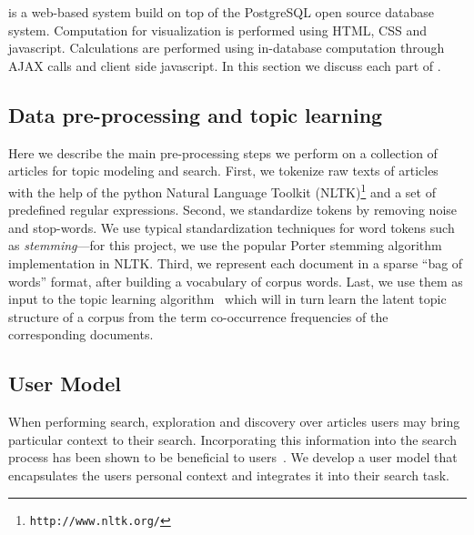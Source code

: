 \section{\system}



\system is a web-based system build on top of the PostgreSQL open 
source database system. Computation for visualization is performed
using HTML, CSS and javascript. Calculations are performed using 
in-database computation through AJAX calls and client side 
javascript. In this section we discuss each part of \system. 

\subsection{Data pre-processing and topic learning}

Here we describe the main pre-processing steps we perform on a 
collection of articles for topic modeling and search. First, 
we tokenize raw texts of articles with the help of the python 
Natural Language Toolkit 
(NLTK)\footnote{\texttt{http://www.nltk.org/}} and a set of 
predefined regular expressions. Second, we standardize tokens by 
removing noise and stop-words. We use typical standardization 
techniques for word tokens such as \textsl{stemming}---for this 
project, we use the popular Porter stemming algorithm~\cite{Porter1980} 
implementation in NLTK. Third, we represent each 
document in a sparse ``bag of words'' format, after building a 
vocabulary of corpus words. Last, we use them as input to the topic 
learning algorithm~\cite{hoffman2010online} which will in turn learn 
the latent topic structure of a corpus from the term co-occurrence 
frequencies of the corresponding documents. %



\subsection{User Model}
When performing search, exploration and discovery over articles 
users may bring particular context to their search. Incorporating 
this information into the search process has been shown to be 
beneficial to users~\cite{DZSRWJ,MZPGSOL}. We develop a user model 
that encapsulates the users personal context and integrates it into 
their search task. 

